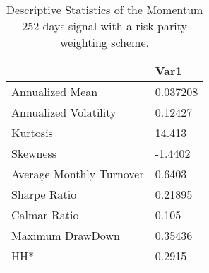 \begin{table}[H]
\centering
\begin{tabular}{ll}
& Var1 \\ 
\hline 
Annualized Mean & 0.037208 \\ 
Annualized Volatility & 0.12427 \\ 
Kurtosis & 14.413 \\ 
Skewness & -1.4402 \\ 
Average Monthly Turnover & 0.6403 \\ 
Sharpe Ratio & 0.21895 \\ 
Calmar Ratio & 0.105 \\ 
Maximum DrawDown & 0.35436 \\ 
HH* & 0.2915 \\ 
\hline
\end{tabular}
\caption{Descriptive Statistics of the Momentum 252 days signal with a risk parity weighting scheme.}
\label{MOM252RP}
\end{table}